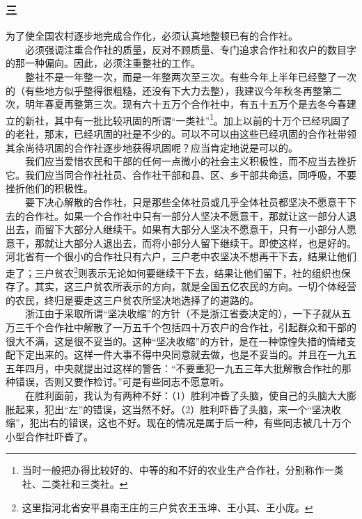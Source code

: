 \documentclass[cn,11pt,chinese]{elegantbook}
\def\myformat#1{\hfil\hfil #1}
\begin{document}
\subsubsection*{\myformat{三}}
为了使全国农村逐步地完成合作化，必须认真地整顿已有的合作社。\\
　　必须强调注重合作社的质量，反对不顾质量、专门追求合作社和农户的数目字的那一种偏向。因此，必须注重整社的工作。\\
　　整社不是一年整一次，而是一年整两次至三次。有些今年上半年已经整了一次的（有些地方似乎整得很粗糙，还没有下大力去整），我建议今年秋冬再整第二次，明年春夏再整第三次。现有六十五万个合作社中，有五十五万个是去冬今春建立的新社，其中有一批比较巩固的所谓“一类社”\footnote[1]{ 当时一般把办得比较好的、中等的和不好的农业生产合作社，分别称作一类社、二类社和三类社。}。加上以前的十万个已经巩固了的老社，那末，已经巩固的社是不少的。可以不可以由这些已经巩固的合作社带领其余尚待巩固的合作社逐步地获得巩固呢？应当肯定地说是可以的。\\
　　我们应当爱惜农民和干部的任何一点微小的社会主义积极性，而不应当去挫折它。我们应当同合作社社员、合作社干部和县、区、乡干部共命运，同呼吸，不要挫折他们的积极性。\\
　　要下决心解散的合作社，只是那些全体社员或几乎全体社员都坚决不愿意干下去的合作社。如果一个合作社中只有一部分人坚决不愿意干，那就让这一部分人退出去，而留下大部分人继续干。如果有大部分人坚决不愿意干，只有一小部分人愿意干，那就让大部分人退出去，而将小部分人留下继续干。即使这样，也是好的。河北省有一个很小的合作社只有六户，三户老中农坚决不想再干下去，结果让他们走了；三户贫农\footnote[2]{ 这里指河北省安平县南王庄的三户贫农王玉坤、王小其、王小庞。}则表示无论如何要继续干下去，结果让他们留下，社的组织也保存了。其实，这三户贫农所表示的方向，就是全国五亿农民的方向。一切个体经营的农民，终归是要走这三户贫农所坚决地选择了的道路的。\\
　　浙江由于采取所谓“坚决收缩”的方针（不是浙江省委决定的），一下子就从五万三千个合作社中解散了一万五千个包括四十万农户的合作社，引起群众和干部的很大不满，这是很不妥当的。这种“坚决收缩”的方针，是在一种惊惶失措的情绪支配下定出来的。这样一件大事不得中央同意就去做，也是不妥当的。并且在一九五五年四月，中央就提出过这样的警告：“不要重犯一九五三年大批解散合作社的那种错误，否则又要作检讨。”可是有些同志不愿意听。\\
　　在胜利面前，我认为有两种不好：（1）胜利冲昏了头脑，使自己的头脑大大膨胀起来，犯出“左”的错误，这当然不好。（2）胜利吓昏了头脑，来一个“坚决收缩”，犯出右的错误，这也不好。现在的情况是属于后一种，有些同志被几十万个小型合作社吓昏了。\\
\end{document}
